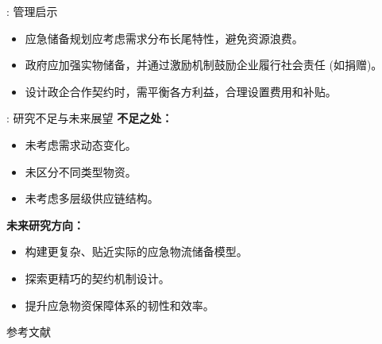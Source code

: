 \documentclass[9pt]{beamer}
\begin{document}
\begin{frame}{\insertsectionhead: 管理启示}
    \begin{itemize}
        \item 应急储备规划应考虑需求分布长尾特性，避免资源浪费。
        \item 政府应加强实物储备，并通过激励机制鼓励企业履行社会责任 (如捐赠)。
        \item 设计政企合作契约时，需平衡各方利益，合理设置费用和补贴。
    \end{itemize}
\end{frame}

\begin{frame}{\insertsectionhead: 研究不足与未来展望}
    \textbf{不足之处：}
    \begin{itemize}
        \item 未考虑需求动态变化。
        \item 未区分不同类型物资。
        \item 未考虑多层级供应链结构。
    \end{itemize}
    \textbf{未来研究方向：}
    \begin{itemize}
        \item 构建更复杂、贴近实际的应急物流储备模型。
        \item 探索更精巧的契约机制设计。
        \item 提升应急物资保障体系的韧性和效率。
    \end{itemize}
\end{frame}

\begin{frame}[allowframebreaks]{参考文献}
    \renewcommand*{\bibfont}{\footnotesize}

    \printbibliography
\end{frame}
\end{document}
